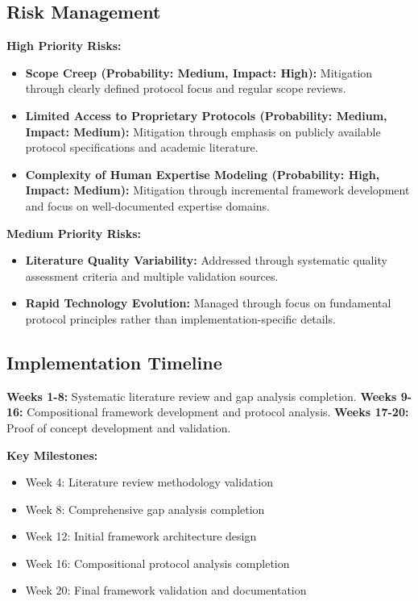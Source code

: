 \documentclass[12pt,a4paper]{article}
\begin{document}
\subsection{Risk Management}

\noindent \textbf{High Priority Risks:}
\begin{itemize}
\item \textbf{Scope Creep (Probability: Medium, Impact: High):} Mitigation through clearly defined protocol focus and regular scope reviews.
\item \textbf{Limited Access to Proprietary Protocols (Probability: Medium, Impact: Medium):} Mitigation through emphasis on publicly available protocol specifications and academic literature.
\item \textbf{Complexity of Human Expertise Modeling (Probability: High, Impact: Medium):} Mitigation through incremental framework development and focus on well-documented expertise domains.
\end{itemize}

\noindent \textbf{Medium Priority Risks:}
\begin{itemize}
\item \textbf{Literature Quality Variability:} Addressed through systematic quality assessment criteria and multiple validation sources.
\item \textbf{Rapid Technology Evolution:} Managed through focus on fundamental protocol principles rather than implementation-specific details.
\end{itemize}

\subsection{Implementation Timeline}

\textbf{Weeks 1-8:} Systematic literature review and gap analysis completion.
\textbf{Weeks 9-16:} Compositional framework development and protocol analysis.
\textbf{Weeks 17-20:} Proof of concept development and validation.

\textbf{Key Milestones:}
\begin{itemize}
\item Week 4: Literature review methodology validation
\item Week 8: Comprehensive gap analysis completion
\item Week 12: Initial framework architecture design
\item Week 16: Compositional protocol analysis completion
\item Week 20: Final framework validation and documentation
\end{itemize}
\end{document}
